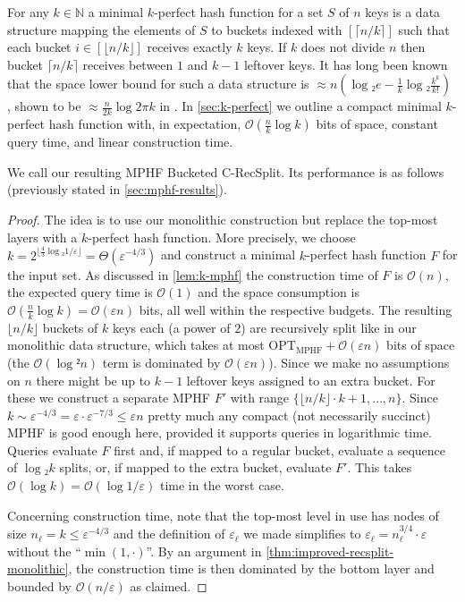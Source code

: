 \documentclass[cleveref,thm-restate]{lipics-v2021}
\def\OPT{\mathrm{OPT}}
\def\OPTMPHF{\OPT_{\mathrm{MPHF}}}
\def\consensus{\texorpdfstring{C\scalebox{0.8}{ONSENSUS}}{CONSENSUS}\xspace}
\begin{document}
For any $k ∈ ℕ$ a minimal $k$-perfect hash function for a set $S$ of $n$ keys is a data structure mapping the elements of $S$ to buckets indexed with $[⌈n/k⌉]$ such that each bucket $i ∈ [⌊n/k⌋]$ receives exactly $k$ keys. If $k$ does not divide $n$ then bucket $⌈n/k⌉$ receives between $1$ and $k-1$ leftover keys.
It has long been known that the space lower bound for such a data structure is $≈ n(\log₂e- \frac 1k\log₂ \frac{k^k}{k!})$ \cite{belazzougui2009hash}, shown to be $≈ \frac{n}{2k} \log 2πk$ in \cite{KLS:PaCHash:2023}. In \cref{sec:k-perfect} we outline a compact minimal $k$-perfect hash function with, in expectation, $𝒪(\frac{n}{k} \log k)$ bits of space, constant query time, and linear construction time.

We call our resulting MPHF Bucketed \consensus-RecSplit. Its performance is as follows (previously stated in \cref{sec:mphf-results}).

\bucketedCRS*

\begin{proof}
    The idea is to use our monolithic construction but replace the top-most layers with a $k$-perfect hash function. More precisely, we choose $k = 2^{⌊\frac{4}{3} \log₂ 1/ε⌋} = Θ(ε^{-4/3})$ and construct a minimal $k$-perfect hash function $F$ for the input set. As discussed in \cref{lem:k-mphf} the construction time of $F$ is $𝒪(n)$, the expected query time is $𝒪(1)$ and the space consumption is $𝒪(\frac{n}{k} \log k) = 𝒪(εn)$ bits, all well within the respective budgets. The resulting $⌊n/k⌋$ buckets of $k$ keys each (a power of $2$) are recursively split like in our monolithic data structure, which takes at most $\OPTMPHF+𝒪(εn)$ bits of space (the $𝒪(\log²n)$ term is dominated by $𝒪(εn)$). Since we make no assumptions on $n$ there might be up to $k-1$ leftover keys assigned to an extra bucket. For these we construct a separate MPHF $F'$ with range $\{⌊n/k⌋·k+1,…,n\}$. Since $k \sim ε^{-4/3} = ε·ε^{-7/3} ≤ εn$ pretty much any compact (not necessarily succinct) MPHF is good enough here, provided it supports queries in logarithmic time. Queries evaluate $F$ first and, if mapped to a regular bucket, evaluate a sequence of $\log₂ k$ splits, or, if mapped to the extra bucket, evaluate $F'$. This takes $𝒪(\log k) = 𝒪(\log 1/ε)$ time in the worst case.
    
    Concerning construction time, note that the top-most level in use has nodes of size $n_ℓ = k ≤ ε^{-4/3}$ and the definition of $ε_ℓ$ we made simplifies to $ε_ℓ = n_ℓ^{3/4}·ε$ without the “$\min(1,·)$”. By an argument in \cref{thm:improved-recsplit-monolithic}, the construction time is then dominated by the bottom layer and bounded by $𝒪(n/ε)$ as claimed.
\end{proof}
\end{document}
